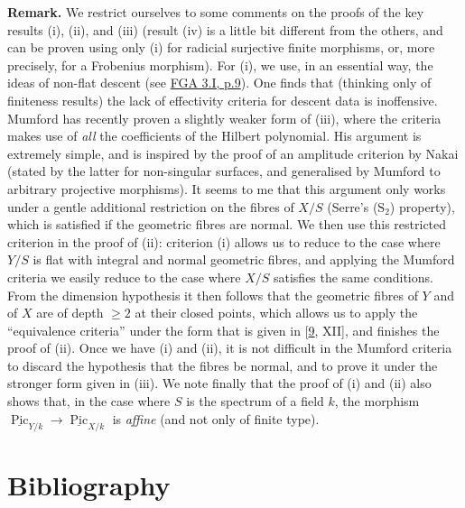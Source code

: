 \documentclass{article}
\newenvironment{rmenv}[1]
  {\phantomsection\par\smallskip\noindent\textbf{#1.}\rmfamily}
  {\par\smallskip}
\newcommand{\oldpage}[1]{\marginpar{\footnotesize$\Big\vert$ \textit{p.~#1}}}
\theoremstyle{definition}
\theoremstyle{definition}
\theoremstyle{definition}
\theoremstyle{definition}
\theoremstyle{remark}
\begin{document}
\begin{rmenv}{Remark}
We restrict ourselves to some comments on the proofs of the key results (i), (ii), and (iii) (result (iv) is a little bit different from the others, and can be proven using only (i) for radicial surjective finite morphisms, or, more precisely, for a Frobenius morphism).
For (i), we use, in an essential way, the ideas of non-flat descent (see \protect\hyperlink{fga-3-i-section-A.2.c}{FGA 3.I, p.9}).
One finds that (thinking only of finiteness results) the lack of effectivity criteria for descent data is inoffensive.
Mumford has recently proven a slightly weaker form of (iii), where the criteria makes use of \emph{all} the coefficients of the Hilbert polynomial.
His argument is extremely simple, and is inspired by the proof of an amplitude criterion by Nakai (stated by the latter for non-singular surfaces, and generalised by Mumford to arbitrary projective morphisms).
It seems to me that this argument only works under a gentle additional restriction on the fibres of \(X/S\) (Serre's (\(\text{S}_2\)) property), which is satisfied if the geometric fibres are normal.
We then use this restricted criterion in the proof of (ii): criterion (i) allows us to reduce to the case where \(Y/S\) is flat with integral and normal geometric fibres, and applying the Mumford criteria we easily reduce to the case where \(X/S\) satisfies the same conditions.
From the dimension hypothesis it then follows that the geometric fibres of \(Y\) and of \(X\) are of depth \(\geqslant 2\) at their closed points, which allows us to apply the ``equivalence criteria'' under the form that is given in {[}\protect\hyperlink{ref-Gro1960b}{9}, XII{]}, and finishes the proof of (ii).
Once we have (i) and (ii), it is not difficult in the Mumford criteria to discard the hypothesis that the fibres be normal, and to prove it under the stronger form given in (iii).
\oldpage{C-11}We note finally that the proof of (i) and (ii) also shows that, in the case where \(S\) is the spectrum of a field \(k\), the morphism \(\underline{\operatorname{Pic}}_{Y/k}\to\underline{\operatorname{Pic}}_{X/k}\) is \emph{affine} (and not only of finite type).

\end{rmenv}

\hypertarget{bibliography}{%
\section*{Bibliography}\label{bibliography}}
\end{document}

